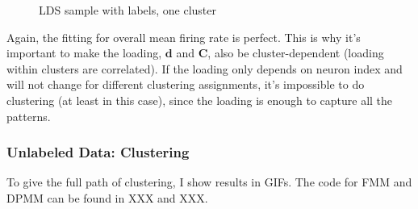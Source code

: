 \documentclass[]{article}
\begin{document}
\begin{figure}[h!]
	\caption{LDS sample with labels, one cluster}
	\label{fig:LDS labeled one cluster}
\end{figure}

Again, the fitting for overall mean firing rate is perfect. This is why it's important to make the loading, \(\mathbf{d}\) and \(\mathbf{C}\), also be cluster-dependent (loading within clusters are correlated). If the loading only depends on neuron index and will not change for different clustering assignments, it's impossible to do clustering (at least in this case), since the loading is enough to capture all the patterns.

\subsubsection{Unlabeled Data: Clustering}
To give the full path of clustering, I show results in GIFs. The code for FMM and DPMM can be found in XXX and XXX.
\end{document}

